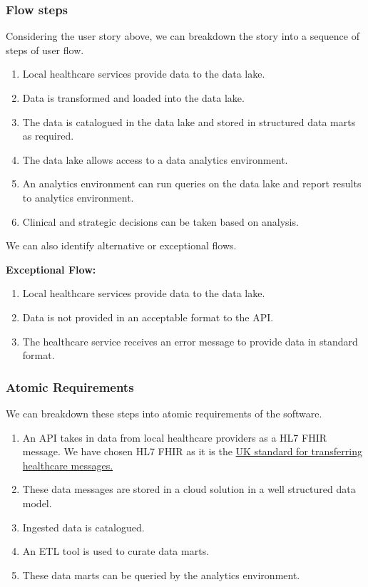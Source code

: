 \documentclass[10pt]{article}
\begin{document}
\subsubsection{Flow steps}\label{flow-steps}

Considering the user story above, we can breakdown the story into a
sequence of steps of user flow.

\begin{enumerate}
\def\labelenumi{\arabic{enumi}.}
\itemsep1pt\parskip0pt
\item
  Local healthcare services provide data to the data lake.
\item
  Data is transformed and loaded into the data lake.
\item
  The data is catalogued in the data lake and stored in structured data
  marts as required.
\item
  The data lake allows access to a data analytics environment.
\item
  An analytics environment can run queries on the data lake and report
  results to analytics environment.
\item
  Clinical and strategic decisions can be taken based on analysis.
\end{enumerate}

We can also identify alternative or exceptional flows.

\textbf{Exceptional Flow:}

\begin{enumerate}
\def\labelenumi{\arabic{enumi}.}
\itemsep1pt\parskip0pt
\item
  Local healthcare services provide data to the data lake.
\item
  Data is not provided in an acceptable format to the API.
\item
  The healthcare service receives an error message to provide data in
  standard format.
\end{enumerate}

\subsubsection{Atomic Requirements}\label{atomic-requirements}

We can breakdown these steps into atomic requirements of the software.

\begin{enumerate}
\def\labelenumi{\arabic{enumi}.}
\itemsep1pt\parskip0pt
\item
  An API takes in data from local healthcare providers as a HL7 FHIR
  message. We have chosen HL7 FHIR as it is the
  \href{https://digital.nhs.uk/services/fhir-uk-core}{UK   standard
  for transferring healthcare messages.}
\item
  These data messages are stored in a cloud solution in a well
  structured data model.
\item
  Ingested data is catalogued.
\item
  An ETL tool is used to curate data marts.
\item
  These data marts can be queried by the analytics environment.
\end{enumerate}
\end{document}
